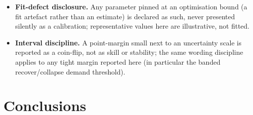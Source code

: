 \documentclass[11pt]{article}
\begin{document}
\begin{itemize}
\item \textbf{Fit-defect disclosure.} Any parameter pinned at an optimisation bound (a fit artefact rather than an estimate) is declared as such, never presented silently as a calibration; representative values here are illustrative, not fitted.
\item \textbf{Interval discipline.} A point-margin small next to an uncertainty scale is reported as a coin-flip, not as skill or stability; the same wording discipline applies to any tight margin reported here (in particular the banded recover/collapse demand threshold).
\end{itemize}

\section{Conclusions}
\end{document}
